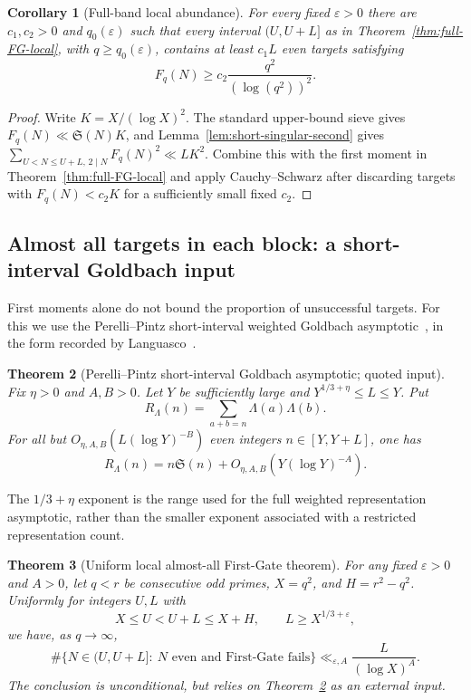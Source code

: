 \documentclass[final,11pt]{elsarticle}
\newtheorem{theorem}{Theorem}[section]
\newtheorem{corollary}[theorem]{Corollary}
\theoremstyle{definition}
\theoremstyle{remark}
\newcommand{\Sg}{\mathfrak{S}}
\newcommand{\eps}{\varepsilon}
\numberwithin{equation}{section}
\begin{document}
\begin{corollary}[Full-band local abundance]
\label{cor:full-FG-local-abundance}
For every fixed $\eps>0$ there are $c_1,c_2>0$ and
$q_0(\eps)$ such that every interval $(U,U+L]$ as in
Theorem~\ref{thm:full-FG-local}, with $q\ge q_0(\eps)$, contains
at least $c_1L$ even targets satisfying
\[
F_q(N)\ge c_2\frac{q^2}{(\log(q^2))^2}.
\]
\end{corollary}
\begin{proof}
Write $K=X/(\log X)^2$. The standard upper-bound sieve gives
$F_q(N)\ll\Sg(N)K$, and Lemma~\ref{lem:short-singular-second} gives
$\sum_{U<N\le U+L,\,2\mid N}F_q(N)^2\ll LK^2$.
Combine this with the first moment in Theorem~\ref{thm:full-FG-local}
and apply Cauchy--Schwarz after discarding targets with
$F_q(N)<c_2K$ for a sufficiently small fixed $c_2$.
\end{proof}


\subsection{Almost all targets in each block: a short-interval Goldbach input}
\label{subsec:PP-blockwise}

First moments alone do not bound the proportion of unsuccessful targets.
For this we use the Perelli--Pintz short-interval weighted Goldbach
asymptotic~\cite{PerelliPintz93}, in the form recorded by
Languasco~\cite[p.~327]{Languasco95}.

\begin{theorem}[Perelli--Pintz short-interval Goldbach asymptotic; quoted input]
\label{thm:PP-Goldbach}
Fix $\eta>0$ and $A,B>0$. Let $Y$ be sufficiently large and
$Y^{1/3+\eta}\le L\le Y$. Put
\[
R_\Lambda(n)=\sum_{a+b=n}\Lambda(a)\Lambda(b).
\]
For all but $O_{\eta,A,B}(L(\log Y)^{-B})$ even integers
$n\in[Y,Y+L]$, one has
\[
R_\Lambda(n)=n\Sg(n)+O_{\eta,A,B}(Y(\log Y)^{-A}).
\]
\end{theorem}

The $1/3+\eta$ exponent is the range used for the full weighted
representation asymptotic, rather than the smaller exponent associated
with a restricted representation count.

\begin{theorem}[Uniform local almost-all First-Gate theorem]
\label{thm:PP-FG-local}
For any fixed $\eps>0$ and $A>0$, let $q<r$ be consecutive odd
primes, $X=q^2$, and $H=r^2-q^2$. Uniformly for integers $U,L$ with
\[
X\le U<U+L\le X+H,\qquad L\ge X^{1/3+\eps},
\]
we have, as $q\to\infty$,
\[
\boxed{\#\{N\in(U,U+L]:\ N\text{ even and First-Gate fails}\}
\ll_{\eps,A}\frac{L}{(\log X)^A}.}
\]
The conclusion is unconditional, but relies on
Theorem~\ref{thm:PP-Goldbach} as an external input.
\end{theorem}
\end{document}
